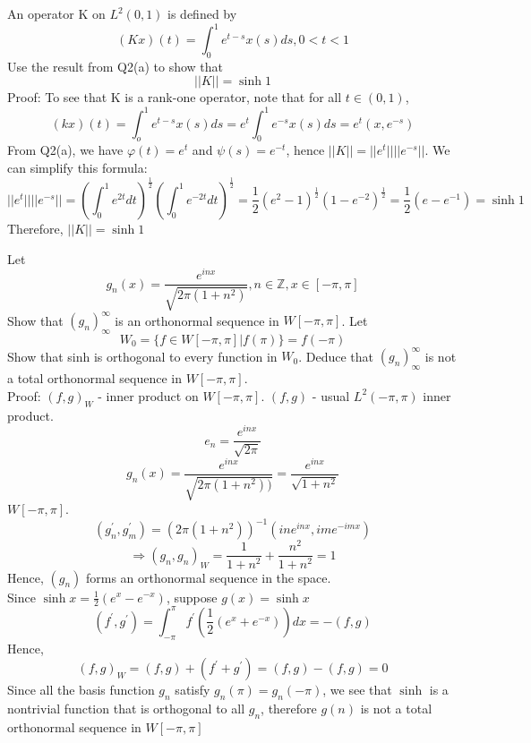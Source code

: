 \documentclass [12pt,letterpaper]{exam}
\begin{document}
\begin{questions}
\question An operator K on $L^{2}(0,1)$ is defined by $$(Kx)(t) = \int_{0}^{1} e^{t-s} x(s)ds,   0<t<1$$
Use the result from Q2(a) to show that $$||K|| = \sinh1$$
Proof: To see that K is a rank-one operator, note that for all $t \in (0,1)$,
$$(kx)(t) = \int_{o}^{1} e^{t-s} x(s)ds = e^t \int_{0}^{1} e^{-s} x(s)ds = e^{t}(x,e^{-s})$$
From Q2(a), we have $\varphi(t) = e^t$ and $\psi(s) = e^{-t}$, hence $||K|| = ||e^{t}||||e^{-s}||$. We can simplify this formula:
$$||e^{t}||||e^{-s}|| = (\int_{0}^{1} e^{2t}dt)^{\frac{1}{2}}(\int_{0}^{1} e^{-2t}dt)^{\frac{1}{2}} = \frac{1}{2}(e^2 - 1)^{\frac{1}{2}}(1 - e^{-2})^\frac{1}{2} = \frac{1}{2}(e - e^{-1}) = \sinh1$$
Therefore, $||K|| = \sinh1$


\question Let $$g_n(x) = \frac{e^{inx}}{\sqrt{2 \pi (1+n^2)}}, n\in \mathbb{Z}, x \in [-\pi, \pi]$$
Show that $(g_n)_{\infty}^{\infty}$ is an orthonormal sequence in $W[-\pi, \pi]$. Let $$W_0 = \big\{ f \in W[-\pi,\pi] | f(\pi) \big\}= f(-\pi)$$
Show that sinh is orthogonal to every function in $W_0$. Deduce that $(g_n)_{\infty}^{\infty}$ is not a total orthonormal sequence in $W[-\pi,\pi]$.\\
Proof: $(f,g)_W$ - inner product on $W[-\pi,\pi]$. $(f,g)$ - usual $L^2 (-\pi,\pi)$ inner product.\\
$$e_n = \frac{e^{inx}}{\sqrt{2\pi}}$$
$$g_n(x) = \frac{e^{inx}}{\sqrt{2\pi(1+n^2))}} = \frac{e^{inx}}{\sqrt{1+n^2}}$$
 $W[-\pi,\pi]$. $$(g_{n}^{'},g_{m}^{'}) = (2\pi(1+n^2))^{-1}({in}e^{inx},ime^{-imx})$$
$$\Rightarrow (g_n,g_n)_W = \frac{1}{1+n^2} +\frac{n^2}{1+n^2} = 1$$
Hence, $(g_n)$ forms an orthonormal sequence in the space.\\
Since $\sinh x = \frac{1}{2}(e^x - e^{-x})$, suppose $g(x) = \sinh x$\\
$$(f^{'},g^{'}) = \int_{-\pi}^{\pi} f^{'}(\frac{1}{2}(e^x + e^{-x})) dx = -(f,g)$$
Hence, $$(f,g)_W = (f,g) + (f^{'} + g^{'}) = (f,g) - (f,g) = 0$$
Since all the basis function $g_n$ satisfy $g_n(\pi) = g_n(-\pi)$, we see that $\sinh$ is a nontrivial function that is orthogonal to all $g_n$, therefore $g(n)$ is not a total orthonormal sequence in $W[-\pi,\pi]$




\end{questions}
\end{document}
